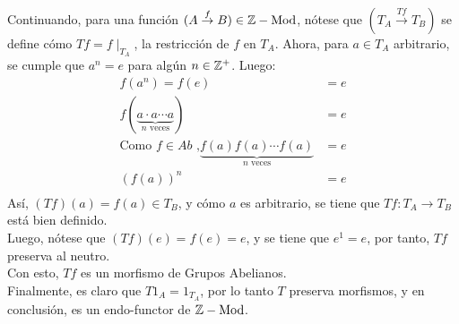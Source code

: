 \begin{exe}
\begin{sol}
    Continuando, para una función $(A\overset{f}{\to}B)\in \mathbb Z-\mathrm{Mod}$, nótese que $(T_A\overset{Tf}{\to}T_B)$ se define cómo $Tf=f\mid_{T_A}$, la restricción de $f$ en $T_A$.
    Ahora, para $a\in T_A$ arbitrario, se cumple que $a^n=e$ para algún $n\in\mathbb Z^+$. Luego:
    \begin{align*}
        f(a^n) = f(e) & = e \\
        f\left(\underbrace{a\cdot a \cdots a}_{n \text{ veces}}\right) & = e \\
        \text{Como $f\in Ab$ ,} \underbrace{f(a)f(a)\cdots f(a)}_{n\text{ veces}} & = e \\
        \left(f(a)\right)^n & = e\\
    \end{align*}
    Así, $(Tf)(a)=f(a)\in T_B$, y cómo $a$ es arbitrario, se tiene que $Tf:T_A\to T_B$ está bien definido.\\
    Luego, nótese que $(Tf)(e)=f(e)=e$, y se tiene que $e^1 = e$, por tanto, $Tf$ preserva al neutro.\\
    Con esto, $Tf$ es un morfismo de Grupos Abelianos.\\
    Finalmente, es claro que $T1_A=1_{T_A}$, por lo tanto $T$ preserva morfismos, y en conclusión, es un endo-functor de $\mathbb Z-\mathrm{Mod}$. 
\end{sol}
    \end{exe}

